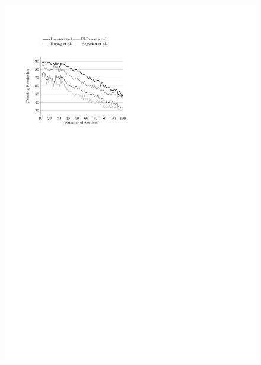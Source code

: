 \documentclass{comjnl}
\begin{document}
\begin{figure}[t]
{	\includegraphics[scale=0.99,page=6]{figures/rome}}
	

\end{figure}
\end{document}
